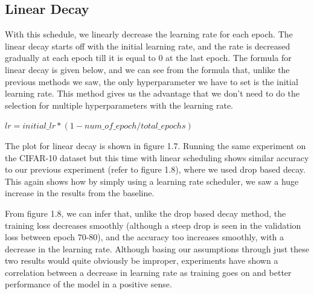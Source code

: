 \subsection{Linear Decay} 
With this schedule, we linearly decrease the learning rate for each epoch. The linear decay starts off with the initial learning rate, and the rate is decreased gradually at each epoch till it is equal to 0 at the last epoch. The formula for linear decay is given below, and we can see from the formula that, unlike the previous methods we saw, the only hyperparameter we have to set is the initial learning rate. This method gives us the advantage that we don't need to do the selection for multiple hyperparameters with the learning rate.

\begin{center}
    \begin{math}
    lr = initial\_lr*(1-num\_of\_epoch/total\_epochs)
    \end{math}
\end{center}

The plot for linear decay is shown in figure 1.7. Running the same experiment on the CIFAR-10 dataset but this time with linear scheduling shows similar accuracy to our previous experiment (refer to figure 1.8), where we used drop based decay. This again shows how by simply using a learning rate scheduler, we saw a huge increase in the results from the baseline.

From figure 1.8, we can infer that, unlike the drop based decay method, the training loss decreases smoothly (although a steep drop is seen in the validation loss between epoch 70-80), and the accuracy too increases smoothly, with a decrease in the learning rate. Although basing our assumptions through just these two results would quite obviously be improper, experiments have shown a correlation between a decrease in learning rate as training goes on and better performance of the model in a positive sense.

